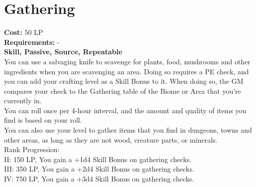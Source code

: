 \section{Gathering}\label{perk:gathering}
\textbf{Cost:} 50 LP\\
\textbf{Requirements:} -\\
\textbf{Skill, Passive, Source, Repeatable}\\
You can use a salvaging knife to scavenge for plants, food, mushrooms and other ingredients when you are scavenging an area.
Doing so requires a PE check, and you can add your crafting level as a Skill Bonus to it.
When doing so, the GM compares your check to the Gathering table of the Biome or Area that you're currently in.\\
You can roll once per 4-hour interval, and the amount and quality of items you find is based on your roll.\\
You can also use your level to gather items that you find in dungeons, towns and other areas, as long as they are not wood, creature parts, or minerals.
\\
Rank Progression:\\
II: 150 LP, You gain a +1d4 Skill Bonus on gathering checks.\\
III: 350 LP, You gain a +2d4 Skill Bonus on gathering checks.\\
IV: 750 LP, You gain a +3d4 Skill Bonus on gathering checks.\\